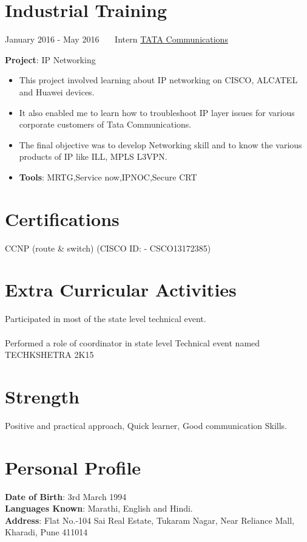 \documentclass[letterpaper]{twentysecondcv} %
\begin{document}
\section{Industrial Training}
\begin{twenty}
	\twentyitem
    	{January 2016 -}
		{May 2016}
        {~~~Intern}
        {\href{https://www.tatacommunications.com/}{TATA Communications}}
        {}
        {
       	\textbf{Project}: IP Networking
        {\begin{itemize}
        \item This project involved learning about IP networking on CISCO, ALCATEL and Huawei devices.
        \item It also enabled me to learn how to troubleshoot IP layer issues for various corporate customers of Tata Communications.
        \item The final objective was to develop Networking skill and to know the various products of IP like ILL, MPLS L3VPN.
        \item \textbf{Tools}: MRTG,Service now,IPNOC,Secure CRT 
        \vspace{2mm}
		\end{itemize}}
        }
\end{twenty}

\section{Certifications}
CCNP (route \& switch) (CISCO ID: - CSCO13172385) \vspace{2mm}

\section{Extra Curricular Activities}
 Participated in most of the state level technical event. \\
 \\
 Performed a role of coordinator in state level Technical event named TECHKSHETRA 2K15

\vspace{2mm}

\section{Strength}
Positive and practical approach, Quick learner, Good communication Skills.
 \vspace{2mm}

\section{Personal Profile}
 \textbf{Date of Birth}: 3rd March 1994 \\
 \textbf{Languages Known}: Marathi, English and Hindi.\\
 \textbf{Address}: Flat No.-104 Sai Real Estate, Tukaram Nagar, Near Reliance Mall, Kharadi, Pune 411014

\vspace{2mm}
\end{document}
